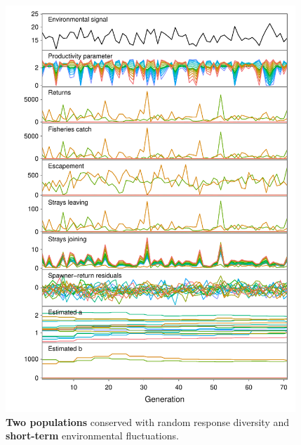 \begin{figure}[htbp]
\centering
\includegraphics[width=4.3in]{metafolio/n-arma-sim-2}
\caption{\textbf{Two populations} conserved with random response diversity and
\textbf{short-term} environmental fluctuations.}
\label{f:eg-n-arma-two}
\end{figure}

\clearpage

